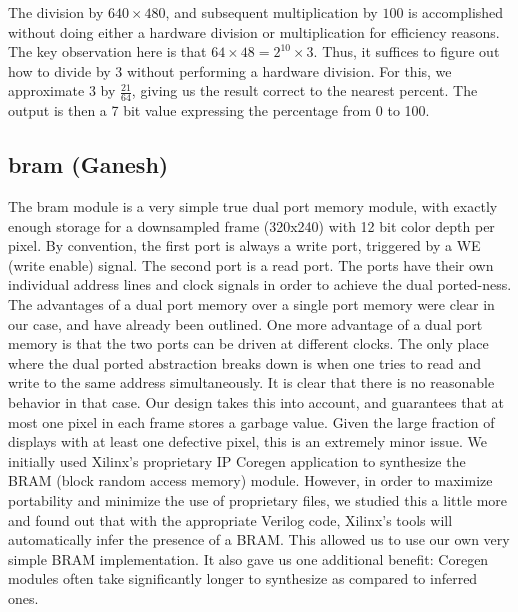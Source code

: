 \documentclass{article}
\begin{document}
The division by $640 \times 480$,
and subsequent multiplication by $100$ is accomplished without doing either a hardware division or multiplication for efficiency reasons.
The key observation here is that $64 \times 48 = 2^{10} \times 3$.
Thus, it suffices to figure out how to divide by $3$ without performing a hardware division.
For this, we approximate $3$ by $\frac{21}{64}$, giving us the result correct to the nearest percent.
The output is then a 7 bit value expressing the percentage from 0 to 100.

\subsection{bram (Ganesh)}
The bram module is a very simple true dual port memory module,
with exactly enough storage for a downsampled frame (320x240) with 12 bit color depth per pixel.
By convention, the first port is always a write port, triggered by a WE (write enable) signal.
The second port is a read port.
The ports have their own individual address lines and clock signals in order to achieve the dual ported-ness.
The advantages of a dual port memory over a single port memory were clear in our case, and have already been outlined.
One more advantage of a dual port memory is that the two ports can be driven at different clocks.
The only place where the dual ported abstraction breaks down is when one tries to read and write to the same address simultaneously.
It is clear that there is no reasonable behavior in that case.
Our design takes this into account, and guarantees that at most one pixel in each frame stores a garbage value.
Given the large fraction of displays with at least one defective pixel, this is an extremely minor issue.
We initially used Xilinx's proprietary IP Coregen application to synthesize the BRAM (block random access memory) module.
However, in order to maximize portability and minimize the use of proprietary files,
we studied this a little more and found out that with the appropriate Verilog code, Xilinx's tools will automatically infer the presence of a BRAM.
This allowed us to use our own very simple BRAM implementation.
It also gave us one additional benefit: Coregen modules often take significantly longer to synthesize as compared to inferred ones.
\end{document}
